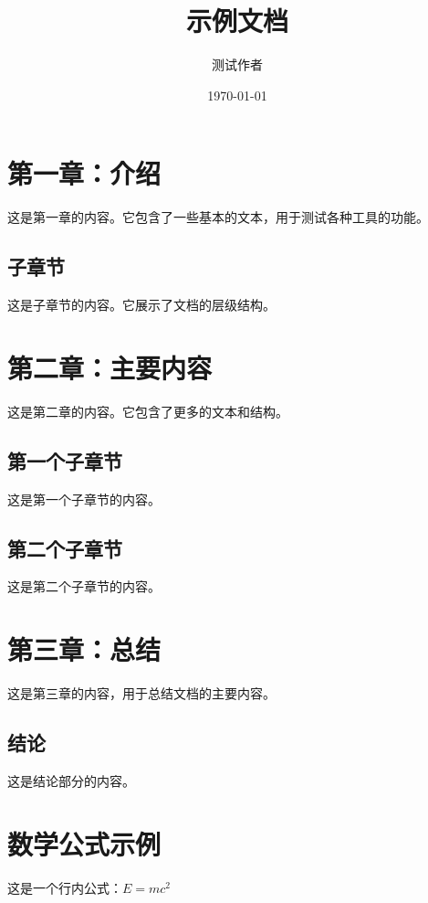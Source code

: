 \documentclass{article}
\title{示例文档}
\author{测试作者}
\date{\today}
\begin{document}
\maketitle

\section{第一章：介绍}

这是第一章的内容。它包含了一些基本的文本，用于测试各种工具的功能。

\subsection{子章节}

这是子章节的内容。它展示了文档的层级结构。

\section{第二章：主要内容}

这是第二章的内容。它包含了更多的文本和结构。

\subsection{第一个子章节}

这是第一个子章节的内容。

\subsection{第二个子章节}

这是第二个子章节的内容。

\section{第三章：总结}

这是第三章的内容，用于总结文档的主要内容。

\subsection{结论}

这是结论部分的内容。

\section{数学公式示例}

这是一个行内公式：$E = mc^2$
\end{document}

